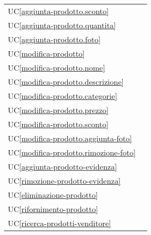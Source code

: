 \begin{longtable}{C{6cm} C{6cm}}
	UC\ref{aggiunta-prodotto.sconto} &  \\

    UC\ref{aggiunta-prodotto.quantita} &  \\

	UC\ref{aggiunta-prodotto.foto} &  \\

    UC\ref{modifica-prodotto} &  \\

	UC\ref{modifica-prodotto.nome} &  \\

    UC\ref{modifica-prodotto.descrizione} &  \\

	UC\ref{modifica-prodotto.categorie} &  \\

    UC\ref{modifica-prodotto.prezzo} &  \\

	UC\ref{modifica-prodotto.sconto} &  \\

    UC\ref{modifica-prodotto.aggiunta-foto} &  \\

	UC\ref{modifica-prodotto.rimozione-foto} &  \\

    UC\ref{aggiunta-prodotto-evidenza} &  \\

	UC\ref{rimozione-prodotto-evidenza} &  \\

    UC\ref{eliminazione-prodotto} &  \\

    UC\ref{rifornimento-prodotto} &  \\

    UC\ref{ricerca-prodotti-venditore} &  \\


\end{longtable}

